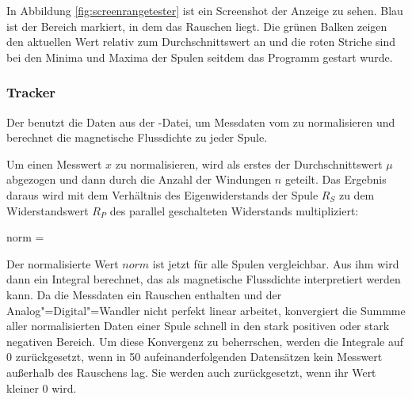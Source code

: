 In Abbildung \ref{fig:screenrangetester} ist ein Screenshot der Anzeige zu sehen.
Blau ist der Bereich markiert, in dem das Rauschen liegt.
Die grünen Balken zeigen den aktuellen Wert relativ zum Durchschnittswert an und die roten Striche sind bei den Minima und Maxima der Spulen seitdem das Programm gestart wurde.

\subsubsection{Tracker}
Der  benutzt die Daten aus der -Datei, um Messdaten vom  zu normalisieren und berechnet die magnetische Flussdichte zu jeder Spule.

Um einen Messwert $x$ zu normalisieren, wird als erstes der Durchschnittswert $\mu$ abgezogen und dann durch die Anzahl der Windungen $n$ geteilt.
Das Ergebnis daraus wird mit dem Verhältnis des Eigenwiderstands der Spule $R_S$ zu dem Widerstandswert $R_P$ des parallel geschalteten Widerstands multipliziert:

\mathematik
norm =  \cdot {}
\mathematikstop

Der normalisierte Wert $norm$ ist jetzt für alle Spulen vergleichbar.
Aus ihm wird dann ein Integral berechnet, das als magnetische Flussdichte interpretiert werden kann.
Da die Messdaten ein Rauschen enthalten und der Analog"=Digital"=Wandler nicht perfekt linear arbeitet, konvergiert die Summme aller normalisierten Daten einer Spule schnell in den stark positiven oder stark negativen Bereich.
Um diese Konvergenz zu beherrschen, werden die Integrale auf 0 zurückgesetzt, wenn in 50  aufeinanderfolgenden Datensätzen kein Messwert außerhalb des Rauschens lag.
Sie werden auch zurückgesetzt, wenn ihr Wert kleiner 0 wird.


